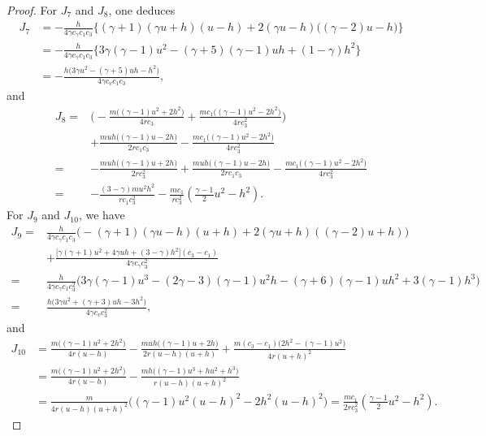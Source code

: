 \documentclass[11pt,reqno]{article}
\numberwithin{equation}{section}
\begin{document}
\begin{proof}
For $J_7$ and $J_8$, one deduces
\begin{align*}
J_7
&= -\frac{h}{4\gamma c_\gamma c_1 c_3} \bigg\{
      (\gamma+1)(\gamma u+h)(u-h)
      + 2(\gamma u-h)\big((\gamma-2)u-h\big)
    \bigg\} \\
&= -\frac{h}{4\gamma c_\gamma c_1 c_3} \bigg\{
      3\gamma(\gamma-1)u^2 - (\gamma+5)(\gamma-1)u h + (1-\gamma)h^2
    \bigg\} \\
&= -\frac{h\big(3\gamma u^2 - (\gamma+5)u h - h^2\big)}{4\gamma c_v c_1 c_3},
\end{align*}
and
\begin{align*}
J_8
=&\bigg(-\frac{m\big((\gamma-1)u^2+2h^2\big)}{4r c_3}
+ \frac{m c_1\big((\gamma-1)u^{2}-2h^{2}\big)}{4r c_3^2}\bigg) \\
&+  \frac{muh\big((\gamma-1)u-2h\big)}{2r c_1 c_3}- \frac{m c_1\big((\gamma-1)u^{2}-2h^{2}\big)}{4r c_3^2}  \\
=& -\frac{m u h \big( (\gamma-1) u + 2h \big)}{2r c_3^2} + \frac{muh\big((\gamma-1)u-2h\big)}{2r c_1 c_3}
- \frac{m c_1\big((\gamma-1)u^{2}-2h^{2}\big)}{4r c_3^2}  \\
=& -\frac{(3-\gamma) m u^2 h^2}{r c_1 c_3^2}- \frac{m c_1}{r c_3^2}\left( \frac{\gamma-1}{2}u^{2} - h^{2} \right).
\end{align*}
For $J_9$ and $J_{10}$, we have
\begin{align*}
J_9
=& \frac{h}{4\gamma c_\gamma c_1 c_3}\Big(-(\gamma+1)(\gamma u-h)(u+h) + 2(\gamma u+h)((\gamma-2)u+h)\Big)\\
  & + \frac{\big[\gamma(\gamma+1)u^2+4\gamma uh+(3-\gamma)h^2\big](c_3-c_1)}{4\gamma c_\gamma c_3^2} \\
=& \frac{h}{4\gamma c_\gamma c_1 c_3^2}\Big( 3\gamma(\gamma-1) u^3-(2\gamma-3)(\gamma-1)u^2 h-(\gamma+6)(\gamma-1)u h^2+3(\gamma-1)h^3 \Big) \\
=& \frac{h\big(3\gamma u^2+(\gamma+3)u h-3h^2\big)}{4\gamma c_v c_3^2 },
\end{align*}
and
\begin{align*}
J_{10}
&= \frac{m\big((\gamma-1)u^{2}+2h^{2}\big)}{4r (u-h)}
   - \frac{m u h\big((\gamma-1)u+2h\big)}{2r (u-h)(u+h)}
   + \frac{m (c_3-c_1) \big(2h^{2}-(\gamma-1)u^{2}\big)}{4r (u+h)^2} \\
&=\frac{m\big((\gamma-1)u^{2}+2h^{2}\big)}{4r (u-h)} -\frac{m h\big(  (\gamma-1)u^3 + hu^2 + h^3 \big)}{r (u-h)(u+h)^2}\\
&= \frac{m}{4r(u-h) (u+h)^2} \Big(
      (\gamma-1)u^{2}(u-h)^2 - 2h^{2}(u-h)^2 \Big)
= \frac{mc_1}{2r c_3^2} \left( \frac{\gamma-1}{2}u^{2} - h^{2} \right).

\end{align*}
\end{proof}
\end{document}
